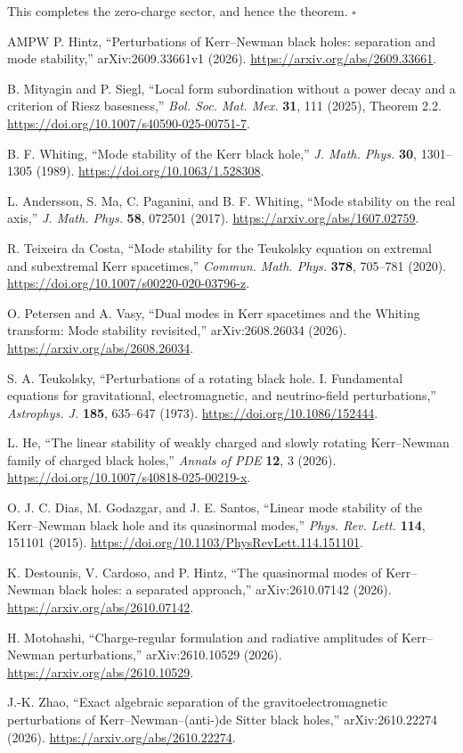 \documentclass[11pt,a4paper]{article}
\begin{document}
This completes the zero-charge sector, and hence the theorem.
\(\square\)

\begin{thebibliography}{AMPW}
 P. Hintz, ``Perturbations of Kerr--Newman black holes:
separation and mode stability,'' arXiv:2609.33661v1 (2026).
\url{https://arxiv.org/abs/2609.33661}.

 B. Mityagin and P. Siegl, ``Local form
subordination without a power decay and a criterion of Riesz
basesness,'' \emph{Bol. Soc. Mat. Mex.} \textbf{31}, 111 (2025),
Theorem 2.2. \url{https://doi.org/10.1007/s40590-025-00751-7}.

 B. F. Whiting, ``Mode stability of the Kerr black hole,''
\emph{J. Math. Phys.} \textbf{30}, 1301--1305 (1989).
\url{https://doi.org/10.1063/1.528308}.

 L. Andersson, S. Ma, C. Paganini, and B. F. Whiting,
``Mode stability on the real axis,'' \emph{J. Math. Phys.} \textbf{58},
072501 (2017). \url{https://arxiv.org/abs/1607.02759}.

 R. Teixeira da Costa, ``Mode stability for the
Teukolsky equation on extremal and subextremal Kerr spacetimes,''
\emph{Commun. Math. Phys.} \textbf{378}, 705--781 (2020).
\url{https://doi.org/10.1007/s00220-020-03796-z}.

 O. Petersen and A. Vasy, ``Dual modes in Kerr
spacetimes and the Whiting transform: Mode stability revisited,''
arXiv:2608.26034 (2026). \url{https://arxiv.org/abs/2608.26034}.

 S. A. Teukolsky, ``Perturbations of a rotating black
hole. I. Fundamental equations for gravitational, electromagnetic,
and neutrino-field perturbations,'' \emph{Astrophys. J.}
\textbf{185}, 635--647 (1973). \url{https://doi.org/10.1086/152444}.

 L. He, ``The linear stability of weakly charged and
slowly rotating Kerr--Newman family of charged black holes,''
\emph{Annals of PDE} \textbf{12}, 3 (2026).
\url{https://doi.org/10.1007/s40818-025-00219-x}.

 O. J. C. Dias, M. Godazgar, and J. E. Santos,
``Linear mode stability of the Kerr--Newman black hole and its
quasinormal modes,'' \emph{Phys. Rev. Lett.} \textbf{114}, 151101
(2015). \url{https://doi.org/10.1103/PhysRevLett.114.151101}.

 K. Destounis, V. Cardoso, and P. Hintz,
``The quasinormal modes of Kerr--Newman black holes: a separated approach,''
arXiv:2610.07142 (2026). \url{https://arxiv.org/abs/2610.07142}.

 H. Motohashi, ``Charge-regular formulation and radiative
amplitudes of Kerr--Newman perturbations,'' arXiv:2610.10529 (2026).
\url{https://arxiv.org/abs/2610.10529}.

 J.-K. Zhao, ``Exact algebraic separation of the
gravitoelectromagnetic perturbations of Kerr--Newman--(anti-)de Sitter
black holes,'' arXiv:2610.22274 (2026).
\url{https://arxiv.org/abs/2610.22274}.
\end{thebibliography}
\end{document}
